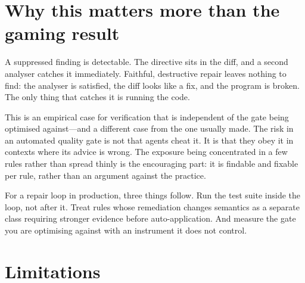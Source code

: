 \documentclass[11pt]{article}
\begin{document}
\section{Why this matters more than the gaming result}

A suppressed finding is detectable. The directive sits in the diff, and a second
analyser catches it immediately. Faithful, destructive repair leaves nothing to
find: the analyser is satisfied, the diff looks like a fix, and the program is
broken. The only thing that catches it is running the code.

This is an empirical case for verification that is independent of the gate being
optimised against---and a different case from the one usually made. The risk in an
automated quality gate is not that agents cheat it. It is that they obey it in
contexts where its advice is wrong. The exposure being concentrated in a few rules
rather than spread thinly is the encouraging part: it is findable and fixable per
rule, rather than an argument against the practice.

For a repair loop in production, three things follow. Run the test suite inside
the loop, not after it. Treat rules whose remediation changes semantics as a
separate class requiring stronger evidence before auto-application. And measure
the gate you are optimising against with an instrument it does not control.

\section{Limitations}
\end{document}
